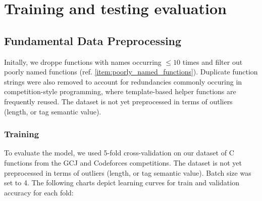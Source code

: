 \documentclass[10pt,english,a4paper]{report}
\begin{document}
\chapter{Training and testing evaluation}
\label{item:chapter_testing}

\section{Fundamental Data Preprocessing}
Initally, we droppe functions with names occurring $\leq 10$ times and filter out poorly named functions (ref. \ref{item:poorly_named_functions}).
Duplicate function strings were also removed to account for redundancies
commonly occuring in competition-style programming, where template-based
helper functions are frequently reused.
The dataset is not yet preprocessed in terms of outliers (length, or tag semantic value).




\subsection{Training}

To evaluate the model, we used 5-fold cross-validation on our dataset of 
C functions from the GCJ and Codeforces competitions. The dataset is not yet
preprocessed in terms of outliers (length, or tag semantic value). Batch size was set to 4. 
The following charts depict learning curves for train and validation accuracy for each fold:
\end{document}
